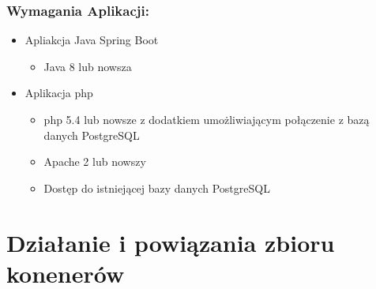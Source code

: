 \documentclass[polish, a4paper, 12pt, oneside]{book}
\begin{document}
\subsubsection{Wymagania Aplikacji:}
\begin{itemize}[noitemsep]
    \item Apliakcja Java Spring Boot
    \begin{itemize}[noitemsep]
    	\item Java 8 lub nowsza
    \end{itemize}
    \item Aplikacja php
	\begin{itemize}[noitemsep]
		\item php 5.4 lub nowsze z dodatkiem umożliwiającym połączenie z bazą danych PostgreSQL
		\item Apache 2 lub nowszy
		\item Dostęp do istniejącej bazy danych PostgreSQL
	\end{itemize}
\end{itemize}

\section{Działanie i powiązania zbioru konenerów}
\end{document}
